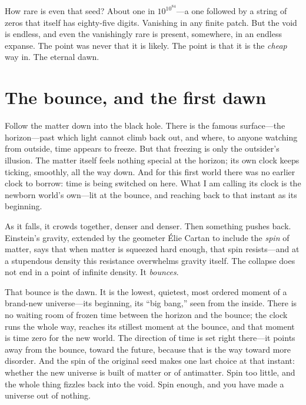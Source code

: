How rare is even that seed? About one in $10^{10^{84}}$---a one followed by a
string of zeros that itself has eighty-five digits. Vanishing in any finite patch.
But the void is endless, and even the vanishingly rare is present, somewhere, in
an endless expanse. The point was never that it is likely. The point is that it is
the \emph{cheap} way in. The eternal dawn.

\section*{The bounce, and the first dawn}

Follow the matter down into the black hole. There is the famous surface---the
horizon---past which light cannot climb back out, and where, to anyone watching
from outside, time appears to freeze. But that freezing is only the outsider's
illusion. The matter itself feels nothing special at the horizon; its own clock
keeps ticking, smoothly, all the way down. And for this first world there was no
earlier clock to borrow: time is being switched on here. What I am calling its
clock is the newborn world's own---lit at the bounce, and reaching back to that
instant as its beginning.

As it falls, it crowds together, denser and denser. Then something pushes back.
Einstein's gravity, extended by the geometer \'Elie Cartan to include the
\emph{spin} of matter, says that when matter is squeezed hard enough, that spin
resists---and at a stupendous density this resistance overwhelms gravity itself.
The collapse does not end in a point of infinite density. It \emph{bounces}.

That bounce is the dawn. It is the lowest, quietest, most ordered moment of a
brand-new universe---its beginning, its ``big bang,'' seen from the inside. There
is no waiting room of frozen time between the horizon and the bounce; the clock
runs the whole way, reaches its stillest moment at the bounce, and that moment is
time zero for the new world. The direction of time is set right there---it points
away from the bounce, toward the future, because that is the way toward more
disorder. And the spin of the original seed makes one last choice at that instant:
whether the new universe is built of matter or of antimatter. Spin too little, and
the whole thing fizzles back into the void. Spin enough, and you have made a
universe out of nothing.


